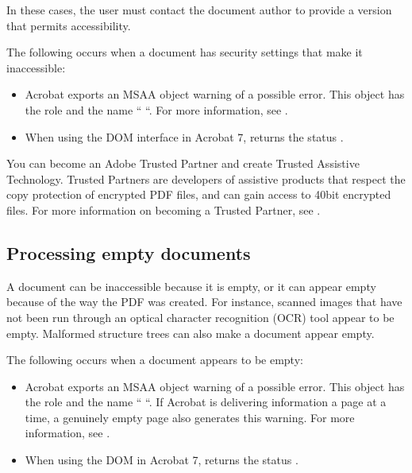 \documentclass[letterpaper,12pt,english,openany,oneside]{sphinxmanual}
\begin{document}
In these cases, the user must contact the document author to provide a version that permits accessibility.

The following occurs when a document has security settings that make it inaccessible:
\begin{itemize}
\item {} 
Acrobat exports an MSAA  object warning of a possible error. This object has the role  and the name “ “. For more information, see .

\item {} 
When using the DOM interface in Acrobat 7,  returns the status  .

\end{itemize}

You can become an Adobe Trusted Partner and create Trusted Assistive Technology. Trusted Partners are developers of assistive products that respect the copy protection of encrypted PDF files, and can gain access to 40\sphinxhyphen{}bit encrypted files. For more information on becoming a Trusted Partner, see  .




\subsection{Processing empty documents}
\label{\detokenize{index:processing-empty-documents}}
A document can be inaccessible because it is empty, or it can appear empty because of the way the PDF was created. For instance, scanned images that have not been run through an optical character recognition (OCR) tool appear to be empty. Malformed structure trees can also make a document appear empty.

The following occurs when a document appears to be empty:
\begin{itemize}
\item {} 
Acrobat exports an MSAA  object warning of a possible error. This object has the role  and the name “ “. If Acrobat is delivering information a page at a time, a genuinely empty page also generates this warning. For more information, see .

\item {} 
When using the DOM in Acrobat 7,  returns the status  .

\end{itemize}
\end{document}
